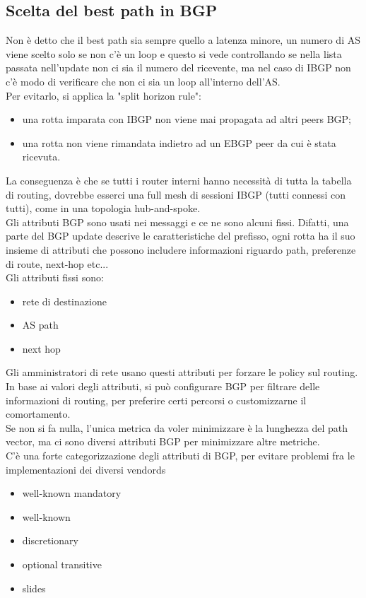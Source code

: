 \documentclass[12pt, oneside]{extbook} %
\begin{document}
\subsection{Scelta del best path in BGP}
Non è detto che il best path sia sempre quello a latenza minore, un numero di AS viene scelto solo se non c'è un loop e questo si vede controllando se nella lista passata nell'update non ci sia il numero del ricevente, ma nel caso di IBGP non c'è modo di verificare che non ci sia un loop all'interno dell'AS.
\\Per evitarlo, si applica la "split horizon rule":
\begin{itemize}
    \item una rotta imparata con IBGP non viene mai propagata ad altri peers BGP;
    \item una rotta non viene rimandata indietro ad un EBGP peer da cui è stata ricevuta.
\end{itemize}
La conseguenza è che se tutti i router interni hanno necessità di tutta la tabella di routing, dovrebbe esserci una full mesh di sessioni IBGP (tutti connessi con tutti), come in una topologia hub-and-spoke.
\\Gli attributi BGP sono usati nei messaggi e ce ne sono alcuni fissi. Difatti, una parte del BGP update descrive le caratteristiche del prefisso, ogni rotta ha il suo insieme di attributi che possono includere informazioni riguardo path, preferenze di route, next-hop etc...
\\Gli attributi fissi sono:
\begin{itemize}
    \item rete di destinazione
    \item AS path
    \item next hop
\end{itemize}
Gli amministratori di rete usano questi attributi per forzare le policy sul routing.
\\In base ai valori degli attributi, si può configurare BGP per filtrare delle informazioni di routing, per preferire certi percorsi o customizzarne il comortamento.
\\Se non si fa nulla, l'unica metrica da voler minimizzare è la lunghezza del path vector, ma ci sono diversi attributi BGP per minimizzare altre metriche.
\\C'è una forte categorizzazione degli attributi di BGP, per evitare problemi fra le implementazioni dei diversi vendords
\begin{itemize}
    \item well-known mandatory
    \item well-known
    \item discretionary
    \item optional transitive
    \item slides
\end{itemize}
\end{document}
